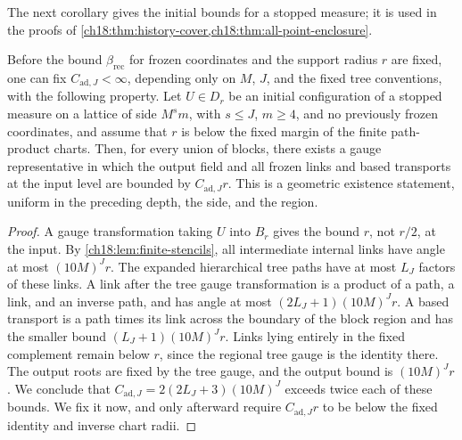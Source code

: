 The next corollary gives the initial bounds for a stopped measure; it is used in the proofs of \cref{ch18:thm:history-cover,ch18:thm:all-point-enclosure}.

\begin{corollary}\label{ch18:cor:initial-joint-allowance}
Before the bound $\beta_{\mathrm{rec}}$ for frozen coordinates and the support radius $r$ are fixed, one can fix $C_{\mathrm{ad},J}<\infty$, depending only on $M$, $J$, and the fixed tree conventions, with the following property. Let $U\in D_r$ be an initial configuration of a stopped measure on a lattice of side $M^sm$, with $s\le J$, $m\ge4$, and no previously frozen coordinates, and assume that $r$ is below the fixed margin of the finite path-product charts. Then, for every union of blocks, there exists a gauge representative in which the output field and all frozen links and based transports at the input level are bounded by $C_{\mathrm{ad},J}r$. This is a geometric existence statement, uniform in the preceding depth, the side, and the region.
\end{corollary}

\begin{proof}
A gauge transformation taking $U$ into $B_r$ gives the bound $r$, not $r/2$, at the input. By \cref{ch18:lem:finite-stencils}, all intermediate internal links have angle at most $(10M)^Jr$. The expanded hierarchical tree paths have at most $L_J$ factors of these links. A link after the tree gauge transformation is a product of a path, a link, and an inverse path, and has angle at most $(2L_J+1)(10M)^Jr$. A based transport is a path times its link across the boundary of the block region and has the smaller bound $(L_J+1)(10M)^Jr$. Links lying entirely in the fixed complement remain below $r$, since the regional tree gauge is the identity there. The output roots are fixed by the tree gauge, and the output bound is $(10M)^Jr$. We conclude that $C_{\mathrm{ad},J}=2(2L_J+3)(10M)^J$ exceeds twice each of these bounds. We fix it now, and only afterward require $C_{\mathrm{ad},J}r$ to be below the fixed identity and inverse chart radii.
\end{proof}

